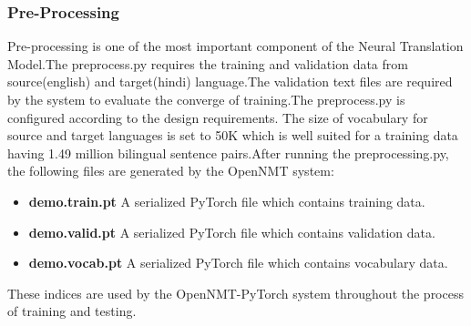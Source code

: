 \subsubsection{Pre-Processing} 
Pre-processing is one of the most important component of the Neural Translation Model.The preprocess.py requires the training and validation data from source(english) and target(hindi) language.The validation text files are required by the system to evaluate the converge of training.The preprocess.py is configured according to the design requirements. The size of vocabulary for source and target languages is set to 50K which is well suited for a training data having 1.49 million bilingual sentence pairs.After running the preprocessing.py, the following files are generated by the OpenNMT system:
\begin{itemize}
    \item \textbf{demo.train.pt} A serialized PyTorch file which contains training data.
    \item \textbf{demo.valid.pt} A serialized PyTorch file which contains validation data.
    \item \textbf{demo.vocab.pt} A serialized PyTorch file which contains vocabulary data.
\end{itemize}

These indices are used by the OpenNMT-PyTorch system throughout the process of training and testing. 
